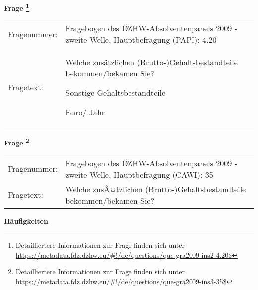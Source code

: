 				\vspace*{0.5cm}
                \noindent\textbf{Frage
	                \footnote{Detailliertere Informationen zur Frage finden sich unter
		              \url{https://metadata.fdz.dzhw.eu/\#!/de/questions/que-gra2009-ins2-4.20$}}}\\
				\begin{tabularx}{\hsize}{@{}lX}
					Fragenummer: &
					  Fragebogen des DZHW-Absolventenpanels 2009 - zweite Welle, Hauptbefragung (PAPI):
					  4.20
 \\
					Fragetext: & Welche zusätzlichen (Brutto-)Gehaltsbestandteile bekommen/bekamen Sie?\par  Sonstige Gehaltsbestandteile\par  Euro/ Jahr \\
				\end{tabularx}
				\vspace*{0.5cm}
                \noindent\textbf{Frage
	                \footnote{Detailliertere Informationen zur Frage finden sich unter
		              \url{https://metadata.fdz.dzhw.eu/\#!/de/questions/que-gra2009-ins3-35$}}}\\
				\begin{tabularx}{\hsize}{@{}lX}
					Fragenummer: &
					  Fragebogen des DZHW-Absolventenpanels 2009 - zweite Welle, Hauptbefragung (CAWI):
					  35
 \\
					Fragetext: & Welche zusÃ¤tzlichen (Brutto-)Gehaltsbestandteile bekommen/bekamen Sie? \\
				\end{tabularx}





        		\vspace*{0.5cm}
                \noindent\textbf{Häufigkeiten}

